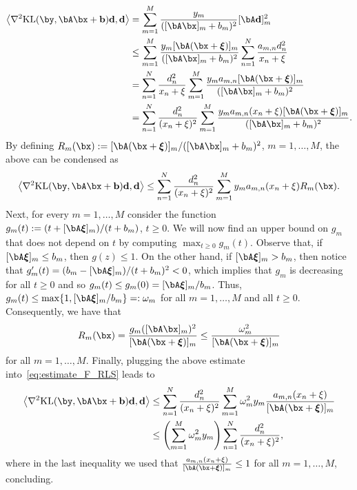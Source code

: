 \documentclass[11pt]{amsart}
\begin{document}
$$
\begin{aligned}
\left<\nabla^2 \mathrm{KL}(\by,\bA\bx+\mathbf{b})\mathbf{d},\mathbf{d} \right>&= \sum_{m=1}^M \frac{y_m}{([\bA \bx]_m +b_m)^2} [\bA \mathbf{d}]_m^2\\
&\leq 
\sum_{m=1}^M\frac{y_m[\bA(\bx+\boldsymbol{\xi})]_m}{([\bA \bx]_m +b_m)^2}\sum_{n=1}^N\frac{a_{m,n}d_n^2}{x_n+\xi}\\
&=\sum_{n=1}^N\frac{d_n^2}{x_n+\xi}\sum_{m=1}^M\frac{y_ma_{m,n}[\bA(\bx+\boldsymbol{\xi})]_m}{([\bA \bx]_m +b_m)^2}\\
&=\sum_{n=1}^N\frac{d_n^2}{(x_n+\xi)^2}\sum_{m=1}^M\frac{y_ma_{m,n}(x_n+\xi)[\bA(\bx+\boldsymbol{\xi})]_m}{([\bA \bx]_m +b_m)^2}.
\end{aligned}
$$
By defining $R_m(\bx):=[\bA(\bx+\boldsymbol{\xi})]_m/([\bA \bx]_m +b_m)^2$, $m=1,\ldots, M$, the above can be condensed as
\begin{equation}\label{eq:estimate_F_RLS}
    \left<\nabla^2 \mathrm{KL}(\by,\bA\bx+\mathbf{b})\mathbf{d},\mathbf{d} \right>\leq \sum_{n=1}^N\frac{d_n^2}{(x_n+\xi)^2}\sum_{m=1}^My_ma_{m,n}(x_n+\xi)R_m(\bx).
\end{equation}
Next, for every $m=1,\ldots, M$ consider the function $g_m(t):=(t+[\bA\boldsymbol{\xi}]_m)/(t+b_m)$, $t\geq 0$. We will now find an upper bound on $g_m$ that does not depend on $t$ by computing $\max_{t\geq 0} g_m(t)$. Observe that, if $[\bA\boldsymbol{\xi}]_m\leq b_m$, then $g(z)\leq 1$. On the other hand, if $[\bA\boldsymbol{\xi}]_m> b_m$, then notice that $g_m'(t)=(b_m-[\bA\boldsymbol{\xi}]_m)/(t+b_m)^2<0$, which implies that $g_m$ is decreasing for all $t\geq 0 $ and so $g_m(t)\leq g_m(0)=[\bA\boldsymbol{\xi}]_m/b_m$. Thus, $g_m(t)\leq \max\{1,[\bA\boldsymbol{\xi}]_m/b_m\}=:\omega_m$ for all $m=1,\ldots, M$ and all $t\geq 0$. Consequently, we have that
$$
R_m(\bx)=\frac{g_m([\bA\bx]_m)^2}{[\bA(\bx+\boldsymbol{\xi})]_m}\leq \frac{\omega_m^2}{[\bA(\bx+\boldsymbol{\xi})]_m}
$$
for all $m=1,\ldots, M$. Finally, plugging the above estimate into~\cref{eq:estimate_F_RLS} leads to
$$
\begin{aligned}
\left<\nabla^2 \mathrm{KL}(\by,\bA\bx+\mathbf{b})\mathbf{d},\mathbf{d} \right>
&\leq 
\sum_{n=1}^N\frac{d_n^2}{(x_n+\xi)^2}\sum_{m=1}^M\omega_m^2y_m\frac{a_{m,n}(x_n+\xi)}{[\bA(\bx+\boldsymbol{\xi})]_m}\\
&\leq 
\left(\sum_{m=1}^M\omega_m^2y_m\right)\sum_{n=1}^N\frac{d_n^2}{(x_n+\xi)^2},
\end{aligned}
$$
where in the last inequality we used that $\frac{a_{m,n}(x_n+\xi)}{[\bA(\bx+\boldsymbol{\xi})]_m}\leq 1$ for all $m=1,\ldots,M$, concluding. 
\end{document}
